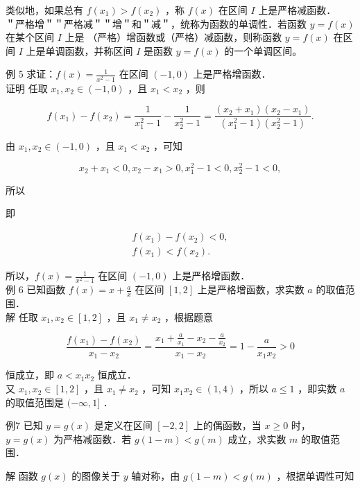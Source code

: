 \documentclass[10pt]{article}
\begin{document}
类似地，如果总有 \(f\left(x_{1}\right)>f\left(x_{2}\right)\) ，称 \(f(x)\) 在区间 \(I\) 上是严格减函数．\\
＂严格增＂＂严格减＂＂增＂和＂减＂，统称为函数的单调性．若函数 \(y=f(x)\) 在某个区间 \(I\) 上是 （严格）增函数或（严格）减函数，则称函数 \(y=f(x)\) 在区间 \(I\) 上是单调函数，并称区间 \(I\) 是函数 \(y=f(x)\) 的一个单调区间。

例 5 求证：\(f(x)=\frac{1}{x^{2}-1}\) 在区间 \((-1,0)\) 上是严格增函数．\\
证明 任取 \(x_{1}, x_{2} \in(-1,0)\) ，且 \(x_{1}<x_{2}\) ，则

\[
f\left(x_{1}\right)-f\left(x_{2}\right)=\frac{1}{x_{1}^{2}-1}-\frac{1}{x_{2}^{2}-1}=\frac{\left(x_{2}+x_{1}\right)\left(x_{2}-x_{1}\right)}{\left(x_{1}^{2}-1\right)\left(x_{2}^{2}-1\right)} .
\]

由 \(x_{1}, x_{2} \in(-1,0)\) ，且 \(x_{1}<x_{2}\) ，可知

\[
x_{2}+x_{1}<0, x_{2}-x_{1}>0, x_{1}^{2}-1<0, x_{2}^{2}-1<0,
\]

所以

即

\[
\begin{gathered}
f\left(x_{1}\right)-f\left(x_{2}\right)<0, \\
f\left(x_{1}\right)<f\left(x_{2}\right) .
\end{gathered}
\]

所以，\(f(x)=\frac{1}{x^{2}-1}\) 在区间 \((-1,0)\) 上是严格增函数．\\
例 6 已知函数 \(f(x)=x+\frac{a}{x}\) 在区间 \([1,2]\) 上是严格增函数，求实数 \(a\) 的取值范围．\\
解 任取 \(x_{1}, x_{2} \in[1,2]\) ，且 \(x_{1} \neq x_{2}\) ，根据题意

\[
\frac{f\left(x_{1}\right)-f\left(x_{2}\right)}{x_{1}-x_{2}}=\frac{x_{1}+\frac{a}{x_{1}}-x_{2}-\frac{a}{x_{2}}}{x_{1}-x_{2}}=1-\frac{a}{x_{1} x_{2}}>0
\]

恒成立，即 \(a<x_{1} x_{2}\) 恒成立．\\
又 \(x_{1}, x_{2} \in[1,2]\) ，且 \(x_{1} \neq x_{2}\) ，可知 \(x_{1} x_{2} \in(1,4)\) ，所以 \(a \leqslant 1\) ，即实数 \(a\) 的取值范围是 \((-\infty, 1]\) ．

例7 已知 \(y=g(x)\) 是定义在区间 \([-2,2]\) 上的偶函数，当 \(x \geqslant 0\) 时，\(y=g(x)\) 为严格减函数．若 \(g(1-m)<g(m)\) 成立，求实数 \(m\) 的取值范围．

解 函数 \(g(x)\) 的图像关于 \(y\) 轴对称，由 \(g(1-m)<g(m)\) ，根据单调性可知
\end{document}
